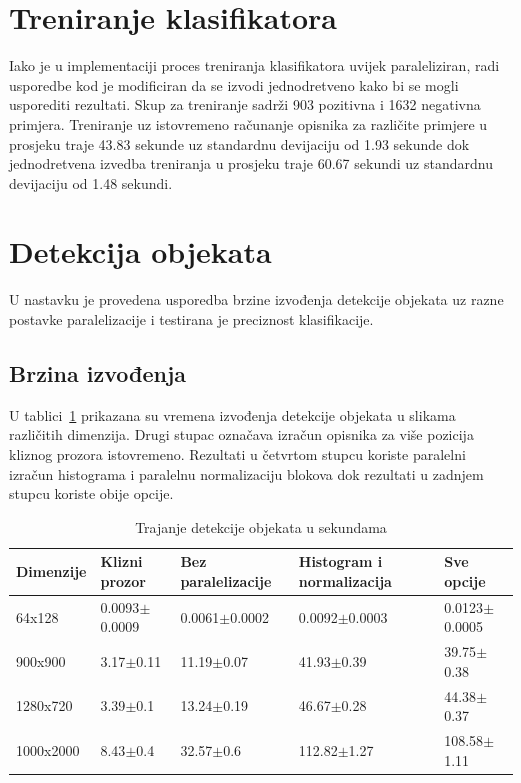 \documentclass[times, utf8, zavrsni]{fer}
\begin{document}
\section{Treniranje klasifikatora}
Iako je u implementaciji proces treniranja klasifikatora uvijek paraleliziran, radi usporedbe kod je modificiran da se izvodi jednodretveno kako bi se mogli usporediti rezultati. Skup za treniranje sadrži 903 pozitivna i 1632 negativna primjera. Treniranje uz istovremeno računanje opisnika za različite primjere u prosjeku traje 43.83 sekunde uz standardnu devijaciju od 1.93 sekunde dok jednodretvena izvedba treniranja u prosjeku traje 60.67 sekundi uz standardnu devijaciju od 1.48 sekundi.

\section{Detekcija objekata}
U nastavku je provedena usporedba brzine izvođenja detekcije objekata uz razne postavke paralelizacije i testirana je preciznost klasifikacije.

\subsection{Brzina izvođenja}
U tablici~\ref{tbl:hog} prikazana su vremena izvođenja detekcije objekata u slikama različitih dimenzija. Drugi stupac označava izračun opisnika za više pozicija kliznog prozora istovremeno. Rezultati u četvrtom stupcu koriste paralelni izračun histograma i paralelnu normalizaciju blokova dok rezultati u zadnjem stupcu koriste obije opcije.

\begin{table}[htb]
	\centering
	\caption{Trajanje detekcije objekata u sekundama}
	\label{tbl:hog}
	\begin{tabular}{lllll} \hline
		Dimenzije & Klizni prozor & Bez paralelizacije & Histogram i normalizacija & Sve opcije\\ \hline
		64x128 & 0.0093$\pm$0.0009 & 0.0061$\pm$0.0002 & 0.0092$\pm$0.0003 & 0.0123$\pm$0.0005\\
		900x900 & 3.17$\pm$0.11 & 11.19$\pm$0.07 & 41.93$\pm$0.39 & 39.75$\pm$0.38\\
		1280x720 & 3.39$\pm$0.1 & 13.24$\pm$0.19 & 46.67$\pm$0.28 & 44.38$\pm$0.37\\
		1000x2000 & 8.43$\pm$0.4 & 32.57$\pm$0.6 & 112.82$\pm$1.27 & 108.58$\pm$1.11\\ \hline
	\end{tabular}
\end{table}
\end{document}
